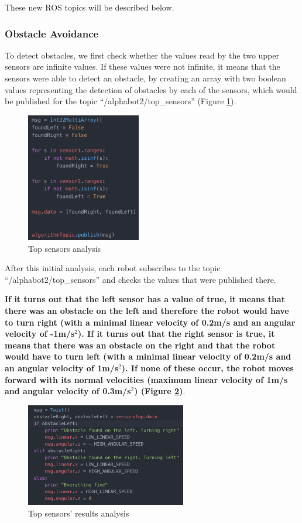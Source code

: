 \documentclass[conference]{IEEEtran}
\begin{document}
These new ROS topics will be described below.

\subsubsection{Obstacle Avoidance} \label{obs}

To detect obstacles, we first check whether the values read by the two upper sensors are infinite values. If these values were not infinite, it means that the sensors were able to detect an obstacle, by creating an array with two boolean values representing the detection of obstacles by each of the sensors, which would be published for the topic ``/alphabot2/top\_sensors'' (Figure \ref{fig:fig10}).

\begin{figure}[H]
    \centering
    \includegraphics[width=5cm]{algorithm1.png}
    \caption{Top sensors analysis}
    \label{fig:fig10}
\end{figure}

After this initial analysis, each robot subscribes to the topic ``/alphabot2/top\_sensors'' and checks the values that were published there.

\textbf{If it turns out that the left sensor has a value of true, it means that there was an obstacle on the left and therefore the robot would have to turn right (with a minimal linear velocity of 0.2m/s and an angular velocity of -1m/s$^{2}$). If it turns out that the right sensor is true, it means that there was an obstacle on the right and that the robot would have to turn left (with a minimal linear velocity of 0.2m/s and an angular velocity of 1m/s$^{2}$). If none of these occur, the robot moves forward with its normal velocities (maximum linear velocity of 1m/s and angular velocity of 0.3m/s$^{2}$) (Figure \ref{fig:fig11})}.

\begin{figure}[H]
    \centering
    \includegraphics[width=7cm]{algorithm2.png}
    \caption{Top sensors' results analysis}
    \label{fig:fig11}
\end{figure}
\end{document}
